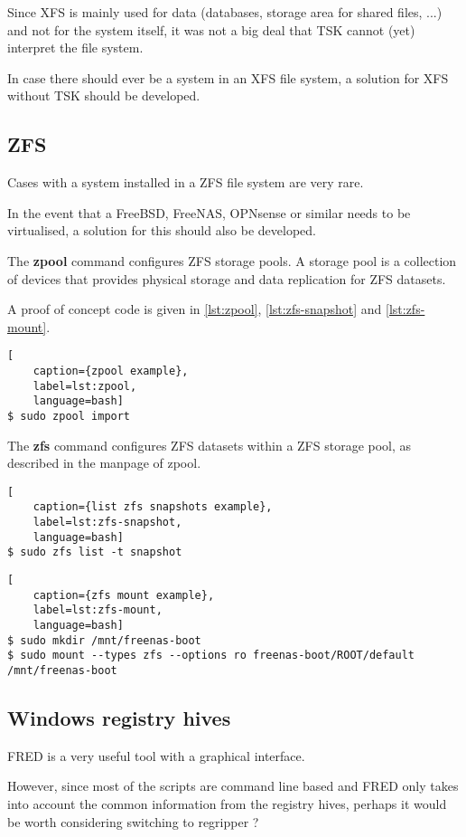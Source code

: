 Since XFS is mainly used for data (databases, storage area for shared files, ...) and not for the system itself, it was not a big deal that TSK cannot (yet) interpret the file system.

In case there should ever be a system in an XFS file system, a solution for XFS without TSK should be developed.

\subsection{ZFS}

Cases with a system installed in a ZFS file system are very rare.

In the event that a FreeBSD, FreeNAS, OPNsense or similar needs to be virtualised, a solution for this should also be developed.

The \textbf{zpool} command configures ZFS storage pools. A storage pool is a collection of devices that provides physical storage and data replication for ZFS datasets.

A proof of concept code is given in \cref{lst:zpool}, \cref{lst:zfs-snapshot} and \cref{lst:zfs-mount}.

\begin{lstlisting}[
    caption={zpool example},
    label=lst:zpool,
    language=bash]
$ sudo zpool import
\end{lstlisting}

The \textbf{zfs} command configures ZFS datasets within a ZFS storage pool, as described in the manpage of zpool.

\begin{lstlisting}[
    caption={list zfs snapshots example},
    label=lst:zfs-snapshot,
    language=bash]
$ sudo zfs list -t snapshot
\end{lstlisting}

\begin{lstlisting}[
    caption={zfs mount example},
    label=lst:zfs-mount,
    language=bash]
$ sudo mkdir /mnt/freenas-boot
$ sudo mount --types zfs --options ro freenas-boot/ROOT/default /mnt/freenas-boot
\end{lstlisting}

\subsection{Windows registry hives}

FRED is a very useful tool with a graphical interface.

However, since most of the scripts are command line based and FRED only takes into account the common information from the registry hives, perhaps it would be worth considering switching to regripper \cite{Regripper}?

